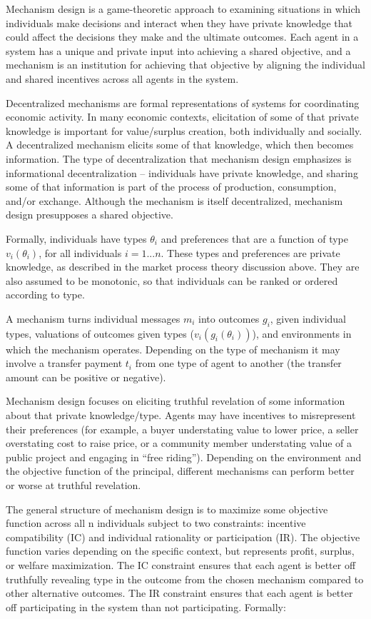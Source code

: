 Mechanism design is a game-theoretic approach to examining situations in which individuals make decisions and interact when they have private knowledge that could affect the decisions they make and the ultimate outcomes. Each agent in a system has a unique and private input into achieving a shared objective, and a mechanism is an institution for achieving that objective by aligning the individual and shared incentives across all agents in the system. 

Decentralized mechanisms are formal representations of systems for coordinating economic activity. In many economic contexts, elicitation of some of that private knowledge is important for value/surplus creation, both individually and socially. A decentralized mechanism elicits some of that knowledge, which then becomes information. The type of decentralization that mechanism design emphasizes is informational decentralization – individuals have private knowledge, and sharing some of that information is part of the process of production, consumption, and/or exchange. Although the mechanism is itself decentralized, mechanism design presupposes a shared objective.

Formally, individuals have types $\theta_i$ and preferences that are a function of type $v_i(\theta_i)$, for all individuals $i=1...n$. These types and preferences are private knowledge, as described in the market process theory discussion above. They are also assumed to be monotonic, so that individuals can be ranked or ordered according to type. 

A mechanism turns individual messages $m_i$ into outcomes $g_i$, given individual types, valuations of outcomes given types ($v_i(g_i(\theta_i))$), and environments in which the mechanism operates. Depending on the type of mechanism it may involve a transfer payment $t_i$ from one type of agent to another (the transfer amount can be positive or negative).

Mechanism design focuses on eliciting truthful revelation of some information about that private knowledge/type. Agents may have incentives to misrepresent their preferences (for example, a buyer understating value to lower price, a seller overstating cost to raise price, or a community member understating value of a public project and engaging in “free riding”). Depending on the environment and the objective function of the principal, different mechanisms can perform better or worse at truthful revelation.

The general structure of mechanism design is to maximize some objective function across all n individuals subject to two constraints: incentive compatibility (IC) and individual rationality or participation (IR). The objective function varies depending on the specific context, but represents profit, surplus, or welfare maximization. The IC constraint ensures that each agent is better off truthfully revealing type in the outcome from the chosen mechanism compared to other alternative outcomes. The IR constraint ensures that each agent is better off participating in the system than not participating. Formally:


